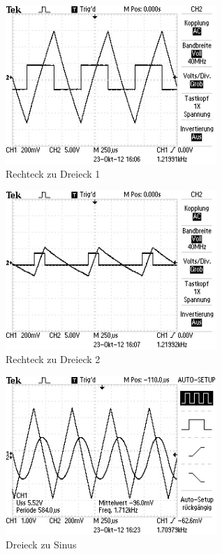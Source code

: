 \begin{figure}[htbp]
\includegraphics[width=8cm] {_pics/rechteck2.JPG}
\centering
\caption* {Rechteck zu Dreieck 1}
\end{figure}

\begin{figure}[htbp]
\includegraphics[width=8cm] {_pics/rechteck1.JPG}
\centering
\caption* {Rechteck zu Dreieck 2}
\end{figure}

\begin{figure}[htbp]
\includegraphics[width=8cm] {_pics/dreieck.JPG}
\centering
\caption* {Dreieck zu Sinus}
\end{figure}







